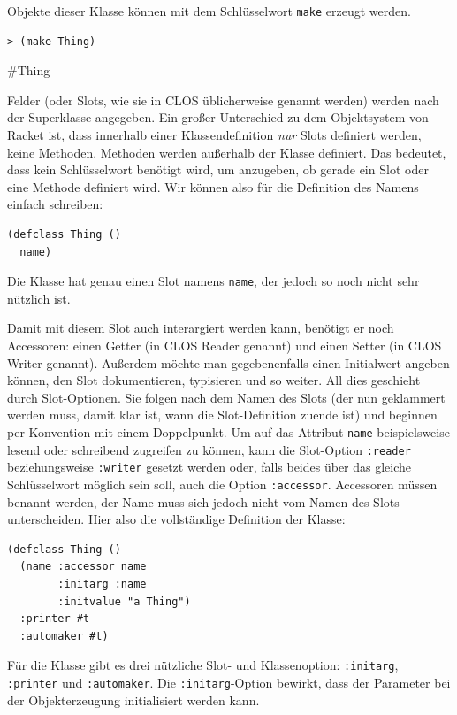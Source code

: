 Objekte dieser Klasse können mit dem Schlüsselwort \texttt{make} erzeugt werden.

\begin{lstlisting}
> (make Thing)
\end{lstlisting}
{\routput \#Thing}

Felder (oder Slots, wie sie in CLOS üblicherweise genannt werden) werden nach der Superklasse angegeben. Ein großer Unterschied zu dem Objektsystem von Racket ist, dass innerhalb einer Klassendefinition \textit{nur} Slots definiert werden, keine Methoden. Methoden werden außerhalb der Klasse definiert. Das bedeutet, dass kein Schlüsselwort benötigt wird, um anzugeben, ob gerade ein Slot oder eine Methode definiert wird. Wir können also für die Definition des Namens einfach schreiben:

\begin{lstlisting}
(defclass Thing ()
  name)
\end{lstlisting}

Die Klasse hat genau einen Slot namens \texttt{name}, der jedoch so noch nicht sehr nützlich ist.

Damit mit diesem Slot auch interargiert werden kann, benötigt er noch Accessoren: einen Getter (in CLOS Reader genannt) und einen Setter (in CLOS Writer genannt). Außerdem möchte man gegebenenfalls einen Initialwert angeben können, den Slot dokumentieren, typisieren und so weiter. All dies geschieht durch Slot-Optionen. Sie folgen nach dem Namen des Slots (der nun geklammert werden muss, damit klar ist, wann die Slot-Definition zuende ist) und beginnen per Konvention mit einem Doppelpunkt. Um auf das Attribut \texttt{name} beispielsweise lesend oder schreibend zugreifen zu können, kann die Slot-Option \texttt{:reader} beziehungsweise \texttt{:writer} gesetzt werden oder, falls beides über das gleiche Schlüsselwort möglich sein soll, auch die Option \texttt{:accessor}. Accessoren müssen benannt werden, der Name muss sich jedoch nicht vom Namen des Slots unterscheiden. Hier also die vollständige Definition der Klasse:

\begin{lstlisting}
(defclass Thing ()
  (name :accessor name
        :initarg :name
        :initvalue "a Thing")
  :printer #t
  :automaker #t)
\end{lstlisting}

Für die Klasse gibt es drei nützliche Slot- und Klassenoption: \texttt{:initarg}, \texttt{:printer} und \texttt{:automaker}. Die \texttt{:initarg}-Option bewirkt, dass der Parameter bei der Objekterzeugung initialisiert werden kann.

